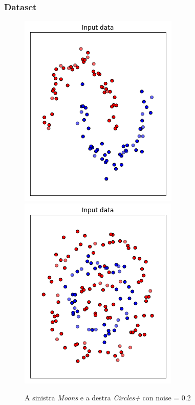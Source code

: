 \documentclass{beamer}
\begin{document}
\begin{frame}
 \frametitle{Dataset}
 \begin{figure}
  \centering
  \includegraphics[scale = 0.5]{images/moons_noise.png}
  \includegraphics[scale = 0.5]{images/circles+_noise.png}
  \caption{\large A sinistra \textit{Moons} e a destra \textit{Circles+} con noise = 0.2}
 \end{figure}

\end{frame}
\end{document}
